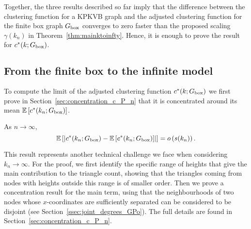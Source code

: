 
Together, the three results described so far imply that the difference between the clustering function for a KPKVB graph and the adjusted clustering function for the finite box graph $G_{\mathrm{box}}$ converges to zero faster than the proposed scaling $\gamma(k_n)$ in Theorem~\ref{thm:mainktoinfty}. Hence, it is enough to prove the result for $c^\ast(k; G_{\mathrm{box}})$. 

\subsection{From the finite box to the infinite model}

To compute the limit of the adjusted clustering function $c^\ast(k; G_{\mathrm{box}})$ we first prove in Section~\ref{sec:concentration_c_P_n} that it is concentrated around its mean $\mathbb{E}\left[c^\ast(k_n; G_{\mathrm{box}})\right]$.


\begin{proposition}\label{prop:concentration_local_clustering_P_n}
As $n \to \infty$,
\[
	\mathbb{E}\left[\left|c^\ast(k_n; G_{\mathrm{box}}) - \mathbb{E}\left[c^\ast(k_n; G_{\mathrm{box}})\right]\right|\right] = o\left(s(k_n)\right).
\]
\end{proposition}

This result represents another technical challenge we face when considering $k_n \to \infty$. For the proof, we first identify the specific range of heights that give the main contribution to the triangle count, showing that the triangles coming from nodes with heights outside this range is of smaller order. Then we prove a concentration result for the main term, using that the neighbourhoods of two nodes whose $x$-coordinates are sufficiently separated can be considered to be disjoint (see Section~\ref{ssec:joint_degrees_GPo}). The full details are found in Section~\ref{sec:concentration_c_P_n}.

